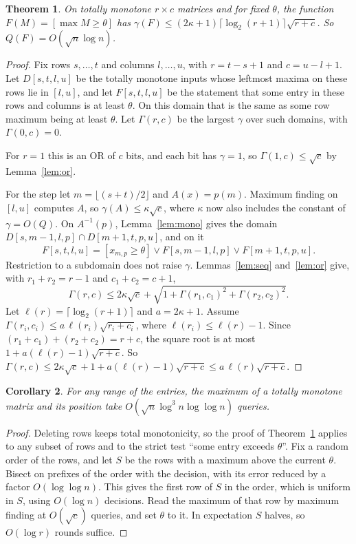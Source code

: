\documentclass[11pt]{article}
\newtheorem{theorem}{Theorem}[section]
\newtheorem{corollary}[theorem]{Corollary}
\theoremstyle{definition}
\theoremstyle{remark}
\begin{document}
\begin{theorem}\label{thm:decide}
On totally monotone $r\times c$ matrices and for fixed $\theta$, the function $F(M)=[\max M\ge\theta]$ has $\gamma(F)\le(2\kappa+1)\lceil\log_2(r+1)\rceil\sqrt{r+c}$. So $Q(F)=O(\sqrt n\log n)$.
\end{theorem}
\begin{proof}
Fix rows $s,\dots,t$ and columns $l,\dots,u$, with $r=t-s+1$ and $c=u-l+1$. Let $D[s,t,l,u]$ be the totally monotone inputs whose leftmost maxima on these rows lie in $[l,u]$, and let $F[s,t,l,u]$ be the statement that some entry in these rows and columns is at least $\theta$. On this domain that is the same as some row maximum being at least $\theta$. Let $\Gamma(r,c)$ be the largest $\gamma$ over such domains, with $\Gamma(0,c)=0$.

For $r=1$ this is an OR of $c$ bits, and each bit has $\gamma=1$, so $\Gamma(1,c)\le\sqrt c$ by Lemma~\ref{lem:or}.

For the step let $m=\lfloor(s+t)/2\rfloor$ and $A(x)=p(m)$. Maximum finding on $[l,u]$ computes $A$, so $\gamma(A)\le\kappa\sqrt c$, where $\kappa$ now also includes the constant of $\gamma=O(Q)$. On $A^{-1}(p)$, Lemma~\ref{lem:mono} gives the domain $D[s,m-1,l,p]\cap D[m+1,t,p,u]$, and on it
\[
F[s,t,l,u]=[x_{m,p}\ge\theta]\vee F[s,m-1,l,p]\vee F[m+1,t,p,u].
\]
Restriction to a subdomain does not raise $\gamma$. Lemmas~\ref{lem:seq} and~\ref{lem:or} give, with $r_1+r_2=r-1$ and $c_1+c_2=c+1$,
\[
\Gamma(r,c)\le 2\kappa\sqrt c+\sqrt{1+\Gamma(r_1,c_1)^2+\Gamma(r_2,c_2)^2}.
\]
Let $\ell(r)=\lceil\log_2(r+1)\rceil$ and $a=2\kappa+1$. Assume $\Gamma(r_i,c_i)\le a\,\ell(r_i)\sqrt{r_i+c_i}$, where $\ell(r_i)\le\ell(r)-1$. Since $(r_1+c_1)+(r_2+c_2)=r+c$, the square root is at most $1+a(\ell(r)-1)\sqrt{r+c}$. So $\Gamma(r,c)\le 2\kappa\sqrt c+1+a(\ell(r)-1)\sqrt{r+c}\le a\,\ell(r)\sqrt{r+c}$.
\end{proof}

\begin{corollary}\label{cor:max}
For any range of the entries, the maximum of a totally monotone matrix and its position take $O(\sqrt n\log^3 n\log\log n)$ queries.
\end{corollary}
\begin{proof}
Deleting rows keeps total monotonicity, so the proof of Theorem~\ref{thm:decide} applies to any subset of rows and to the strict test ``some entry exceeds $\theta$''. Fix a random order of the rows, and let $S$ be the rows with a maximum above the current $\theta$. Bisect on prefixes of the order with the decision, with its error reduced by a factor $O(\log\log n)$. This gives the first row of $S$ in the order, which is uniform in $S$, using $O(\log n)$ decisions. Read the maximum of that row by maximum finding at $O(\sqrt c)$ queries, and set $\theta$ to it. In expectation $S$ halves, so $O(\log r)$ rounds suffice.
\end{proof}
\end{document}
